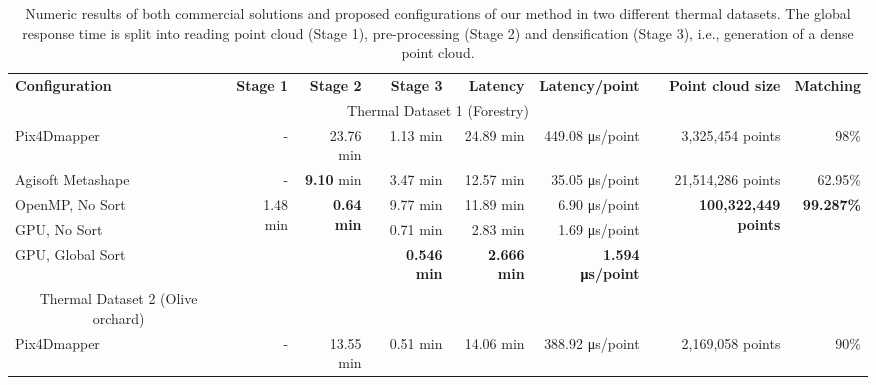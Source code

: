 \newcommand\numExperiments{4}

\renewcommand{\arraystretch}{1.2}
\begin{table}
    \centering
    \sffamily\footnotesize
    \caption{Numeric results of both commercial solutions and proposed configurations of our method in two different thermal datasets. The global response time is split into reading point cloud (Stage 1), pre-processing (Stage 2) and densification (Stage 3), i.e., generation of a dense point cloud.\\ }
    \label{table:thermal_results}
    \begin{tabular}{l@{\hskip 0.25in}|rrr|r|r|r|r}
    \toprule
    \textbf{Configuration} & \textbf{Stage 1} & \textbf{Stage 2} & \textbf{Stage 3} & \textbf{Latency} & \textbf{Latency/point} & \textbf{Point cloud size} & \textbf{Matching}\\
    \cmidrule{1-8}
    \multicolumn{8}{c}{Thermal Dataset 1 (Forestry)}\\
    \cmidrule{1-8}
    Pix4Dmapper & - & 23.76 \si{\minute} & 1.13 \si{\minute} & 24.89 \si{\minute} & 449.08 \si{\micro\second}/point & 3,325,454 points & 98\%\\
    Agisoft Metashape & - & \textbf{9.10} \si{\minute} & 3.47 \si{\minute} & 12.57 \si{\minute} & 35.05 \si{\micro\second}/point & 21,514,286 points & 62.95\%\\
    \cmidrule{1-8}
    OpenMP, No Sort & \multirow{\numExperiments}{*}{1.48 \si{\minute}} & \multirow{\numExperiments}{*}{\textbf{0.64 \si{\minute}}} & 9.77 \si{\minute} & 11.89 \si{\minute} & 6.90 \si{\micro\second}/point & \multirow{\numExperiments}{*}{\textbf{100,322,449 points}} & \multirow{\numExperiments}{*}{\textbf{99.287\%}}\\
    GPU, No Sort & & & 0.71 \si{\minute} & 2.83 \si{\minute} & 1.69 \si{\micro\second}/point & &\\
    GPU, Global Sort & & & \textbf{0.546 \si{\minute}} & \textbf{2.666 \si{\minute}} & \textbf{1.594 \si{\micro\second}/point} & &\\
    \bottomrule
    \toprule
    \multicolumn{8}{c}{Thermal Dataset 2 (Olive orchard)}\\
    \cmidrule{1-8}
    Pix4Dmapper & - & 13.55 \si{\minute} & 0.51 \si{\minute} & 14.06 \si{\minute} & 388.92 \si{\micro\second}/point & 2,169,058 points & 90\%\\

\end{tabular}
\end{table}

